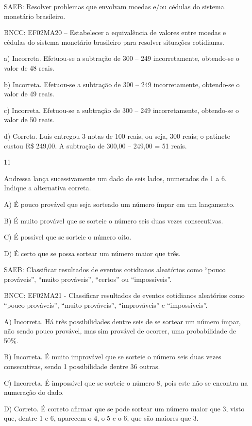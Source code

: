 \begin{escolha}
\begin{escolha}
{{{{{{{{SAEB: Resolver problemas que envolvam moedas e/ou cédulas do
sistema monetário brasileiro. 

BNCC: EF02MA20 -- Estabelecer a
equivalência de valores entre moedas e cédulas do sistema monetário
brasileiro para resolver situações cotidianas.

a) Incorreta. Efetuou-se a subtração de 300 -- 249 incorretamente, obtendo-se o
valor de 48 reais.

b) Incorreta. Efetuou-se a subtração de 300 -- 249 incorretamente, obtendo-se o
valor de 49 reais.

c) Incorreta. Efetuou-se a subtração de 300 -- 249 incorretamente, obtendo-se o valor de 50 reais.

d) Correta. Luís entregou 3 notas de 100 reais, ou seja, 300 reais; o patinete custou R\$ 249,00. A subtração de 300,00 -- 249,00 = 51 reais.

\num{11}

Andressa lança sucessivamente um dado de seis lados, numerados de 1 a 6.
Indique a alternativa correta.

A) É pouco provável que seja sorteado um número ímpar em um lançamento.

B) É muito provável que se sorteie o número seis duas vezes
consecutivas.

C) É possível que se sorteie o número oito.

D) É certo que se possa sortear um número maior que três.

SAEB: Classificar resultados de eventos cotidianos aleatórios
como ``pouco prováveis'', ``muito prováveis'', ``certos'' ou
``impossíveis''.

BNCC: EF02MA21 - Classificar resultados de eventos cotidianos aleatórios
como ``pouco prováveis'', ``muito prováveis'', ``improváveis'' e
``impossíveis''.

A) Incorreta. Há três possibilidades dentre seis de se sortear um número
ímpar, não sendo pouco provável, mas sim provável de ocorrer, uma
probabilidade de 50\%.

B) Incorreta. É muito improvável que se sorteie o número seis duas vezes
consecutivas, sendo 1 possibilidade dentre 36 outras.

C) Incorreta. É impossível que se sorteie o número 8, pois este não se
encontra na numeração do dado.

D) Correto. É correto afirmar que se pode sortear um número maior que 3,
visto que, dentre 1 e 6, aparecem o 4, o 5 e o 6, que são maiores que 3.

}}}}}}}}
\end{escolha}
\end{escolha}
